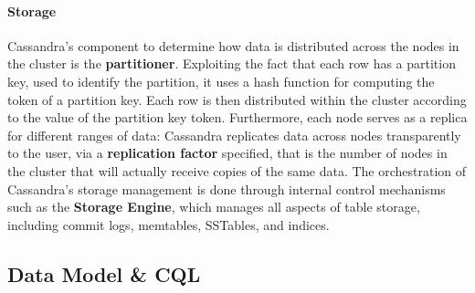 \paragraph{Storage} Cassandra's component to determine how data is distributed across the nodes in the cluster is the \textbf{partitioner}. Exploiting the fact that each row has a partition key, used to identify the partition, it uses a hash function for computing the token of a partition key. Each row is then distributed within the cluster according to the value of the partition key token. Furthermore, each node serves as a replica for different ranges of data: Cassandra replicates data across nodes transparently to the user, via a \textbf{replication factor} specified, that is the number of nodes in the cluster that will actually receive copies of the same data.
The orchestration of Cassandra's storage management is done through internal control mechanisms such as the \textbf{Storage Engine}, which manages all aspects of table storage, including commit logs, memtables, SSTables, and indices.

\subsection{Data Model \& CQL}

